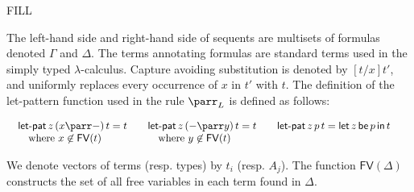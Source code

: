 \begin{entry}{FILL}
\begin{calculus}
\end{calculus}


\begin{clarifications}
The left-hand side and right-hand side of sequents are multisets of
formulas denoted $\Gamma$ and $\Delta$.  The terms annotating formulas
are standard terms used in the simply typed $\lambda$-calculus.
Capture avoiding substitution is denoted by $[t/x]t'$, and
uniformly replaces every occurrence of $x$ in $t'$ with $t$.  The
definition of the let-pattern function used in the rule $\parr_L$ is
defined as follows:
\begin{center}
    \begin{math}
      \begin{array}{lll}      
        \begin{array}{lll}
          \letpat{z}{(x \parr -)}{t} = t\\
          \,\,\,\,\,\,\mbox{where } x \not\in \mathsf{FV}(t)\\
        \end{array}
        & 
          \begin{array}{lll}
            \letpat{z}{(- \parr y)}{t} = t\\
        \,\,\,\,\,\,\mbox{where } y \not\in \mathsf{FV}(t)\\
          \end{array}
        & 
          \begin{array}{lll}
            \letpat{z}{p}{t} = \letbe{z}{p}{t}\\
            & \\
          \end{array}
      \end{array}
    \end{math}
\end{center}
We denote vectors of terms (resp. types) by $t_i$ (resp. $A_j$).  The
function $\mathsf{FV}(\Delta)$ constructs the set of all free
variables in each term found in $\Delta$.
\end{clarifications}


\end{entry}
